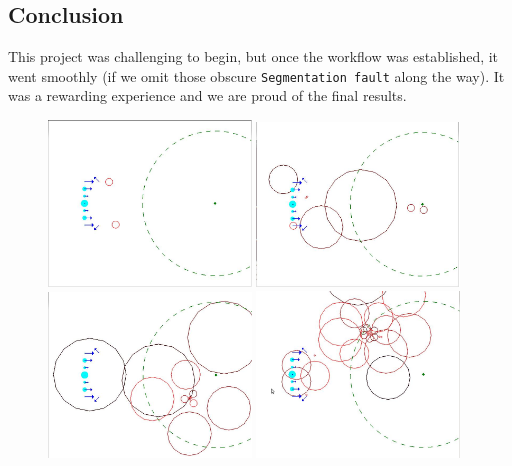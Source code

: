 \documentclass[a4paper]{article} %
\begin{document}
\begin{multicols*}{2}
\section{Conclusion}
This project was challenging to begin, but once the workflow was established, it went smoothly
(if we omit those obscure \texttt{Segmentation fault} along the way).
It was a rewarding experience and we are proud of the final results.

\begin{figure}[H]
\centering
\includegraphics[width=0.48\textwidth]{1.jpg}
\includegraphics[width=0.48\textwidth]{2.jpg}
\includegraphics[width=0.48\textwidth]{3.jpg}
\includegraphics[width=0.48\textwidth]{4.jpg}

\end{figure}
\end{multicols*}
\end{document}

